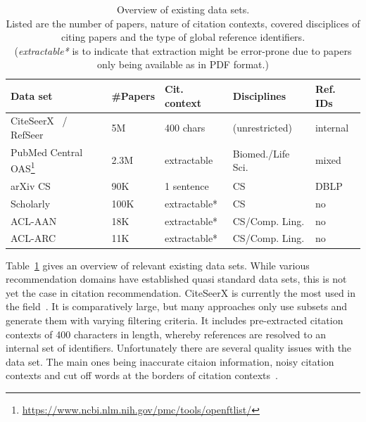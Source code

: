 \begin{table}
\centering
    \caption[Overview of existing data sets.]{Overview of existing data sets.\\Listed are the number of papers, nature of citation contexts, covered disciplices of citing papers and the type of global reference identifiers.\\(\emph{extractable*} is to indicate that extraction might be error-prone due to papers only being available as in PDF format.)}
    \label{tab:datasets}
\begin{center}
    \begin{tabular}{lllll}
    \toprule
    Data set & \#Papers & Cit. context & Disciplines & Ref. IDs \\
    \midrule
    CiteSeerX~\cite{Caragea2014} / RefSeer~\cite{Huang2014} & 5M & 400 chars & (unrestricted) & internal \\
    PubMed Central OAS\footnote{\url{https://www.ncbi.nlm.nih.gov/pmc/tools/openftlist/}} & 2.3M & extractable & Biomed./Life Sci. & mixed \\
    arXiv CS~\cite{Faerber2018} &  90K & 1 sentence & CS & DBLP \\
    Scholarly~\cite{Sugiyama2013}  & 100K & extractable* & CS & no \\
    ACL-AAN  & 18K & extractable* & CS/Comp. Ling. & no  \\ %
    ACL-ARC  & 11K & extractable* & CS/Comp. Ling. & no \\ %
    \bottomrule
    \end{tabular}
\end{center}
\end{table}

Table~\ref{tab:datasets} gives an overview of relevant existing data sets. While various recommendation domains have established quasi standard data sets, this is not yet the case in citation recommendation. CiteSeerX is currently the most used in the field~\cite{Beel2016}. It is comparatively large, but many approaches only use subsets and generate them with varying filtering criteria. It includes pre-extracted citation contexts of 400 characters in length, whereby references are resolved to an internal set of identifiers. Unfortunately there are several quality issues with the data set. The main ones being inaccurate citaion information, noisy citation contexts and cut off words at the borders of citation contexts~\cite{Roy2016}.

